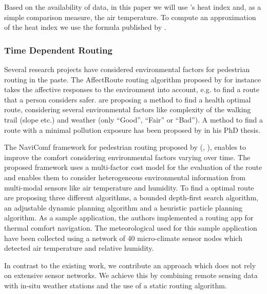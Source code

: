 Based on the availability of data, in this paper we will use \citeauthor{Steadman1979}'s heat index \parencite{Steadman1979} and, as a simple comparison measure, the air temperature. To compute an approximation of the heat index we use the formula published by \textcite[77]{Stull2011}.  

\subsubsection{Time Dependent Routing}
Several research projects have considered environmental factors for pedestrian routing in the paste. The AffectRoute routing algorithm proposed by \textcite{Huang2014} for instance takes the affective responses to the environment into account, e.g. to find a route that a person considers safer.  \textcite{Sharker2012} are proposing a method to find a health optimal route, considering several environmental factors like complexity of the walking trail (slope etc.) and weather (only “Good”, “Fair” or “Bad”). A method to find a route with a minimal pollution exposure has been proposed by \textcite{Hasenfratz2015} in his PhD thesis.

The NaviComf framework for pedestrian routing proposed by \citeauthor{Dang2012} (\citeyear{Dang2012}, \citeyear{Dang2013}), enables to improve the comfort considering environmental factors varying over time. The proposed framework uses a multi-factor cost model for the evaluation of the route and enables them to consider heterogeneous environmental information from multi-modal
 sensors like air temperature and humidity. To find a optimal route \textcite{Dang2013} are proposing three different algorithms,  a bounded depth-first search algorithm, an adjustable dynamic planning algorithm and a heuristic particle planning algorithm. As a sample application, the authors implemented a routing app for thermal comfort navigation. The meteorological used for this sample application have been collected using a network of 40 micro-climate sensor nodes which detected air temperature and relative humidity. 

In contrast to the existing work, we contribute an approach which does not rely on extensive sensor networks. We achieve this by combining remote sensing data with in-situ weather stations and the use of a static routing algorithm.